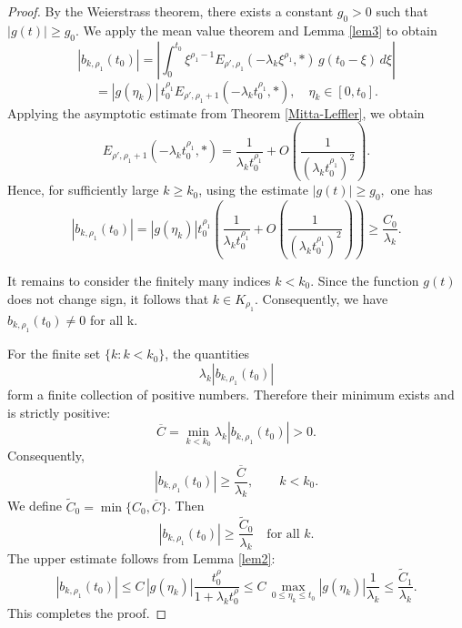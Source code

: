 \documentclass[12pt, reqno]{amsart}
\theoremstyle{definition}
\theoremstyle{remark}
\numberwithin{equation}{section}
\begin{document}
\begin{proof}
    By the Weierstrass theorem, there exists a constant $g_0>0$ such that
$|g(t)| \ge g_0$.
We apply the mean value theorem and Lemma \ref{lem3} to obtain
\[
|b_{k,\rho_1}(t_0)|
=
\left|
\int_{0}^{t_0}
\xi^{\rho_1-1}
E_{\rho',\rho_1}(-\lambda_k \xi^{\rho_1},*)
\, g(t_0-\xi)\, d\xi
\right|
\]
\[=
|g(\eta_k)|\, t_0^{\rho_1}
E_{\rho',\rho_1+1}(-\lambda_k t_0^{\rho_1},*),
\quad
\eta_k \in [0,t_0].
\]
Applying the asymptotic estimate from Theorem \ref{Mitta-Leffler}, we obtain
\[
E_{\rho',\rho_1+1}(-\lambda_k t_0^{\rho_1},*)
=
\frac{1}{\lambda_k t_0^{\rho_1}}
+
O\!\left(\frac{1}{(\lambda_k t_0^{\rho_1})^2}\right).
\]
Hence, for sufficiently large $k\ge k_0$, using the estimate
$
|g(t)| \ge g_0,
$
one has
\[
|b_{k,\rho_1}(t_0)|
=
|g(\eta_k)|t_0^{\rho_1}
\left(\frac{1}{\lambda_kt_0^{\rho_1}}+O\left(\frac{1}{\left(\lambda_kt_0^{\rho_1}\right)^2}\right)\right)
\ge
\frac{C_0}{\lambda_k}.
\]

It remains to consider the finitely many indices $k<k_0$.
Since the function $g(t)$ does not change sign, it follows that $k \in K_{\rho_1}$. Consequently, we have
$
b_{k,\rho_1}(t_0) \neq 0
$ for all k.

For the finite set $\{k: k<k_0\}$,
the quantities
\[
\lambda_k |b_{k,\rho_1}(t_0)|
\]
form a finite collection of positive numbers.
Therefore their minimum exists and is strictly positive:
\[
\overline{C}=
\min_{k<k_0}
\lambda_k |b_{k,\rho_1}(t_0)|
>0.
\]
Consequently,
\[
|b_{k,\rho_1}(t_0)|
\ge
\frac{\overline{C}}{\lambda_k},
\qquad
k<k_0.
\]
We define
$
\widetilde C_0=\min\{C_0,\overline{C}\}
$. Then 
\[
|b_{k,\rho_1}(t_0)|
\ge
\frac{\widetilde C_0}{\lambda_k}
\quad
\text{for all } k.
\]
The upper estimate follows from Lemma \ref{lem2}:
\[
|b_{k,\rho_1}(t_0)|
\le
C\, |g(\eta_k)|
\frac{t_0^{\rho}}{1 + \lambda_k t_0^{\rho}}
\le
C \, \max_{0 \le \eta_k \le t_0} |g(\eta_k)|
\frac{1}{\lambda_k}
\le
\frac{\widetilde C_1}{\lambda_k}.
\]
This completes the proof.
\end{proof}
\end{document}
